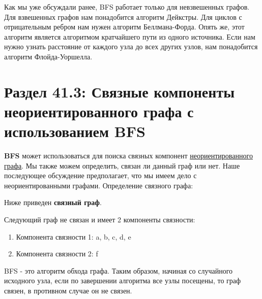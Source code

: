 
Как мы уже обсуждали ранее, BFS работает только для невзвешенных графов. Для взвешенных графов нам понадобится алгоритм Дейкстры. Для циклов с отрицательным ребром нам нужен алгоритм Беллмана-Форда. Опять же, этот алгоритм является алгоритмом кратчайшего пути из одного источника. Если нам нужно узнать расстояние от каждого узла до всех других узлов, нам понадобится алгоритм Флойда-Уоршелла.

\section*{Раздел 41.3: Связные компоненты неориентированного графа с использованием BFS}

\textbf{BFS} может использоваться для поиска связных компонент \href{https://mathinsight.org/definition/undirected_graph}{\underline{неориентированного графа}}. Мы также можем определить, связан ли данный граф или нет. Наше последующее обсуждение предполагает, что мы имеем дело с неориентированными графами. Определение связного графа:

\vspace{\baselineskip}


\vspace{\baselineskip}

Ниже приведен \textbf{связный граф}.

\begin{center}
\end{center}

Следующий граф не связан и имеет 2 компоненты связности:

\begin{enumerate}
    \item Компонента связности 1: {a, b, c, d, e}
    \item Компонента связности 2: {f}
\end{enumerate}

\begin{center}
\end{center}

BFS - это алгоритм обхода графа. Таким образом, начиная со случайного исходного узла, если по завершении алгоритма все узлы посещены, то граф связен, в противном случае он не связен.

\vspace{\baselineskip}

